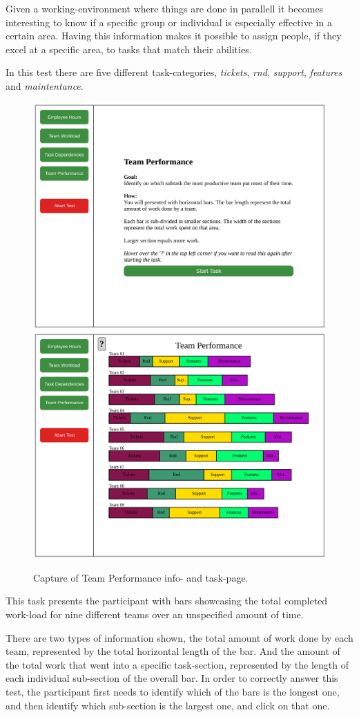 {    \textit{\ideaFour}

    Given a working-environment where things are done in parallell it
    becomes interesting to know if a specific group or individual is
    especially effective in a certain area. Having this information makes
    it possible to assign people, if they excel at a specific area, to
    tasks that match their abilities.

    In this test there are five different task-categories,
    \textit{tickets},
    \textit{rnd},
    \textit{support},
    \textit{features} and
    \textit{maintentance}.

    \begin{figure}[h!]
      \centering
      \includegraphics[width=.49\textwidth]{figures/captures/webapp_team_performance_info.pdf}
      \includegraphics[width=.49\textwidth]{figures/captures/webapp_team_performance_task.pdf}
      \caption{Capture of Team Performance info- and task-page.}
    \end{figure}

    This task presents the participant with bars showcasing the total
    completed work-load for nine different teams over an unspecified amount
    of time.

    There are two types of information shown, the total amount of work done
    by each team, represented by the total horizontal length of the bar.
    And the amount of the total work that went into a specific
    task-section, represented by the length of each individual sub-section
    of the overall bar.
    In order to correctly answer this test, the participant first needs to
    identify which of the bars is the longest one, and then identify which
    sub-section is the largest one, and click on that one.

}
